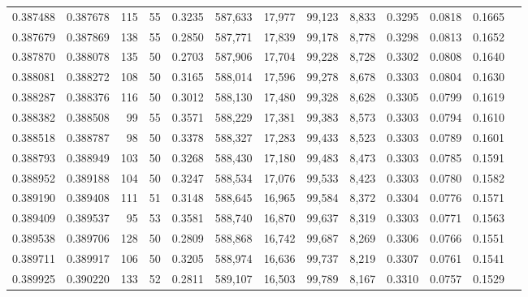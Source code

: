 \begin{tabular}{rrrrrrrrrrrrr}
0.387488 & 0.387678 &   115 &  55 &                                     0.3235 & 587,633 &  17,977 &  99,123 &   8,833 & 0.3295 & 0.0818 & 0.1665 \\
0.387679 & 0.387869 &   138 &  55 &                                     0.2850 & 587,771 &  17,839 &  99,178 &   8,778 & 0.3298 & 0.0813 & 0.1652 \\
0.387870 & 0.388078 &   135 &  50 &                                     0.2703 & 587,906 &  17,704 &  99,228 &   8,728 & 0.3302 & 0.0808 & 0.1640 \\
0.388081 & 0.388272 &   108 &  50 &                                     0.3165 & 588,014 &  17,596 &  99,278 &   8,678 & 0.3303 & 0.0804 & 0.1630 \\
0.388287 & 0.388376 &   116 &  50 &                                     0.3012 & 588,130 &  17,480 &  99,328 &   8,628 & 0.3305 & 0.0799 & 0.1619 \\
0.388382 & 0.388508 &    99 &  55 &                                     0.3571 & 588,229 &  17,381 &  99,383 &   8,573 & 0.3303 & 0.0794 & 0.1610 \\
0.388518 & 0.388787 &    98 &  50 &                                     0.3378 & 588,327 &  17,283 &  99,433 &   8,523 & 0.3303 & 0.0789 & 0.1601 \\
0.388793 & 0.388949 &   103 &  50 &                                     0.3268 & 588,430 &  17,180 &  99,483 &   8,473 & 0.3303 & 0.0785 & 0.1591 \\
0.388952 & 0.389188 &   104 &  50 &                                     0.3247 & 588,534 &  17,076 &  99,533 &   8,423 & 0.3303 & 0.0780 & 0.1582 \\
0.389190 & 0.389408 &   111 &  51 &                                     0.3148 & 588,645 &  16,965 &  99,584 &   8,372 & 0.3304 & 0.0776 & 0.1571 \\
0.389409 & 0.389537 &    95 &  53 &                                     0.3581 & 588,740 &  16,870 &  99,637 &   8,319 & 0.3303 & 0.0771 & 0.1563 \\
0.389538 & 0.389706 &   128 &  50 &                                     0.2809 & 588,868 &  16,742 &  99,687 &   8,269 & 0.3306 & 0.0766 & 0.1551 \\
0.389711 & 0.389917 &   106 &  50 &                                     0.3205 & 588,974 &  16,636 &  99,737 &   8,219 & 0.3307 & 0.0761 & 0.1541 \\
0.389925 & 0.390220 &   133 &  52 &                                     0.2811 & 589,107 &  16,503 &  99,789 &   8,167 & 0.3310 & 0.0757 & 0.1529 \\

\end{tabular}

